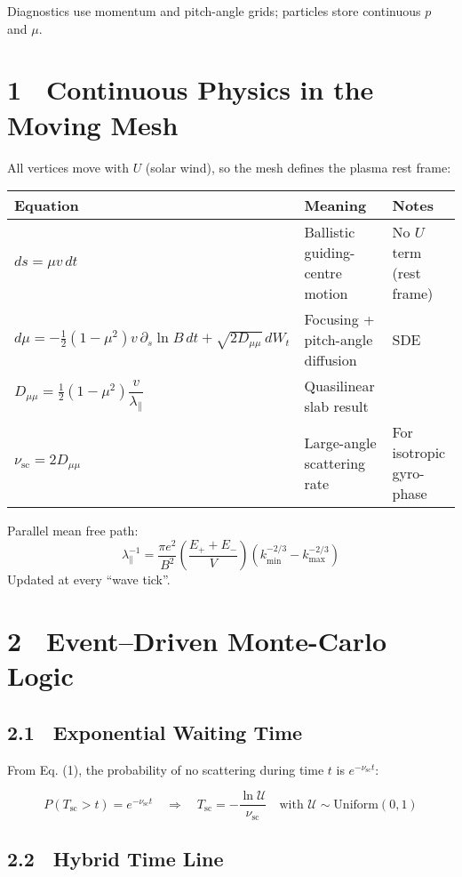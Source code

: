 {Diagnostics use momentum and pitch-angle grids; particles store continuous $p$ and $\mu$.

\section*{1 Continuous Physics in the Moving Mesh}

All vertices move with $U$ (solar wind), so the mesh defines the plasma rest frame:

\begin{tabular}{@{}lll@{}}
\toprule
\textbf{Equation} & \textbf{Meaning} & \textbf{Notes} \\
\midrule
$ds = \mu v\,dt$ & Ballistic guiding-centre motion & No $U$ term (rest frame) \\
$d\mu = -\frac{1}{2}(1 - \mu^2)v\,\partial_s \ln B\,dt + \sqrt{2 D_{\mu\mu}}\,dW_t$ & Focusing + pitch-angle diffusion & SDE \\
$D_{\mu\mu} = \frac{1}{2}(1 - \mu^2)\dfrac{v}{\lambda_\parallel}$ & Quasilinear slab result & \\
$\nu_{\text{sc}} = 2 D_{\mu\mu}$ & Large-angle scattering rate & For isotropic gyro-phase \\
\bottomrule
\end{tabular}

\medskip

Parallel mean free path:
\[
\lambda_\parallel^{-1}
= \frac{\pi e^2}{B^2}
  \left(\frac{E_+ + E_-}{V}\right)
  \left(k_{\min}^{-2/3} - k_{\max}^{-2/3}\right)
\tag{1}
\]
Updated at every “wave tick”.

\section*{2 Event–Driven Monte-Carlo Logic}

\subsection*{2.1 Exponential Waiting Time}

From Eq. (1), the probability of no scattering during time $t$ is $e^{-\nu_{\text{sc}} t}$:

\[
P(T_{\text{sc}} > t) = e^{-\nu_{\text{sc}} t} \quad \Longrightarrow \quad
\boxed{
T_{\text{sc}} = -\frac{\ln \mathcal{U}}{\nu_{\text{sc}}}
}
\quad \text{with } \mathcal{U} \sim \text{Uniform}(0,1)
\]

\subsection*{2.2 Hybrid Time Line}

}
